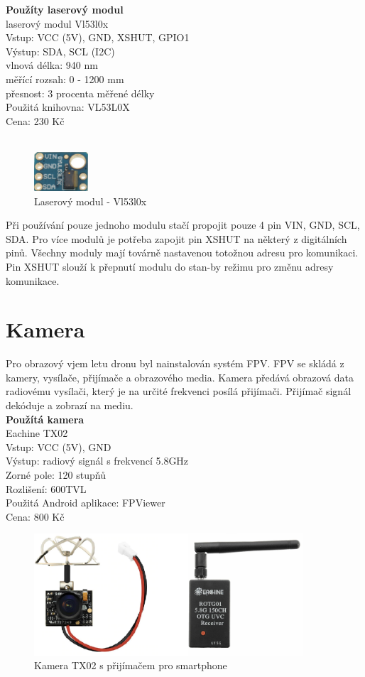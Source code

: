\textbf{Použíty laserový modul}\\
laserový modul Vl53l0x\\
Vstup: VCC (5V), GND, XSHUT, GPIO1\\
Výstup: SDA, SCL (I2C)\\
vlnová délka: 940 nm\\
měřící rozsah: 0 - 1200 mm\\
přesnost: 3 procenta měřené délky\\
Použitá knihovna: VL53L0X\\
Cena: 230 Kč\\
\cite{laser}\\

\begin{figure}[H]
	\centering
	\includegraphics[width=2cm]{pictures/laser.jpg}
	\caption{Laserový modul - Vl53l0x}
\end{figure}

Při používání pouze jednoho modulu stačí propojit pouze 4 pin VIN, GND, SCL, SDA. Pro více modulů je potřeba zapojit pin XSHUT na některý z digitálních pinů. Všechny moduly mají továrně nastavenou totožnou adresu pro komunikaci. Pin XSHUT slouží k přepnutí modulu do stan-by režimu pro změnu adresy komunikace.\\ 

\section{Kamera}
Pro obrazový vjem letu dronu byl nainstalován systém FPV. FPV se skládá z kamery, vysílače, přijímače a obrazového media. Kamera předává obrazová data radiovému vysílači, který je na určité frekvenci posílá přijímači. Přijímač signál dekóduje a zobrazí na mediu.\\

\textbf{Použítá kamera}\\
Eachine TX02\\
Vstup: VCC (5V), GND\\
Výstup: radiový signál s frekvencí 5.8GHz\\
Zorné pole: 120 stupňů\\
Rozlišení: 600TVL\\
Použitá Android aplikace: FPViewer\\
Cena: 800 Kč\\

\begin{figure}[H]
	\centering
	\includegraphics[width=10cm]{pictures/camera.png}
	\caption{Kamera TX02 s přijímačem pro smartphone}
\end{figure}
